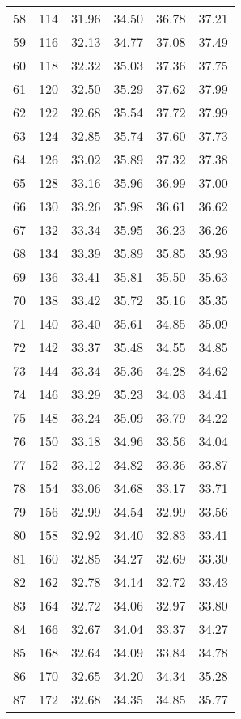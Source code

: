 \begin{longtable}{rrllll}
		58 & 114 & 31.96 & 34.50 & 36.78 & 37.21 \\ 
		59 & 116 & 32.13 & 34.77 & 37.08 & 37.49 \\ 
		60 & 118 & 32.32 & 35.03 & 37.36 & 37.75 \\ 
		61 & 120 & 32.50 & 35.29 & 37.62 & 37.99 \\ 
		62 & 122 & 32.68 & 35.54 & 37.72 & 37.99 \\ 
		63 & 124 & 32.85 & 35.74 & 37.60 & 37.73 \\ 
		64 & 126 & 33.02 & 35.89 & 37.32 & 37.38 \\ 
		65 & 128 & 33.16 & 35.96 & 36.99 & 37.00 \\ 
		66 & 130 & 33.26 & 35.98 & 36.61 & 36.62 \\ 
		67 & 132 & 33.34 & 35.95 & 36.23 & 36.26 \\ 
		68 & 134 & 33.39 & 35.89 & 35.85 & 35.93 \\ 
		69 & 136 & 33.41 & 35.81 & 35.50 & 35.63 \\ 
		70 & 138 & 33.42 & 35.72 & 35.16 & 35.35 \\ 
		71 & 140 & 33.40 & 35.61 & 34.85 & 35.09 \\ 
		72 & 142 & 33.37 & 35.48 & 34.55 & 34.85 \\ 
		73 & 144 & 33.34 & 35.36 & 34.28 & 34.62 \\ 
		74 & 146 & 33.29 & 35.23 & 34.03 & 34.41 \\ 
		75 & 148 & 33.24 & 35.09 & 33.79 & 34.22 \\ 
		76 & 150 & 33.18 & 34.96 & 33.56 & 34.04 \\ 
		77 & 152 & 33.12 & 34.82 & 33.36 & 33.87 \\ 
		78 & 154 & 33.06 & 34.68 & 33.17 & 33.71 \\ 
		79 & 156 & 32.99 & 34.54 & 32.99 & 33.56 \\ 
		80 & 158 & 32.92 & 34.40 & 32.83 & 33.41 \\ 
		81 & 160 & 32.85 & 34.27 & 32.69 & 33.30 \\ 
		82 & 162 & 32.78 & 34.14 & 32.72 & 33.43 \\ 
		83 & 164 & 32.72 & 34.06 & 32.97 & 33.80 \\ 
		84 & 166 & 32.67 & 34.04 & 33.37 & 34.27 \\ 
		85 & 168 & 32.64 & 34.09 & 33.84 & 34.78 \\ 
		86 & 170 & 32.65 & 34.20 & 34.34 & 35.28 \\ 
		87 & 172 & 32.68 & 34.35 & 34.85 & 35.77 \\ 

\end{longtable}
